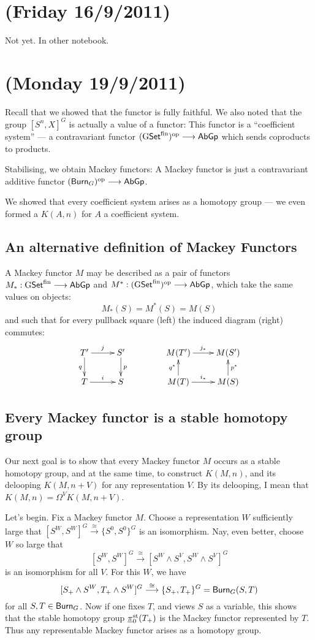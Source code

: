 \documentclass[11pt]{article}
\newcommand{\NewLecture}[3]{\section{#1 {\small(#2/#3/2011)}}}
\begin{document}
\NewLecture{}{Friday 16}{9} Not yet. In other notebook.
\NewLecture{}{Monday 19}{9} Recall that
we showed that the functor
is fully faithful. We also noted that the group $[S^n,X]^G$ is actually a value of a functor:
This functor is a ``coefficient system'' --- a contravariant functor $(\operatorname{{G\mathsf{Set}^\textup{fin}}})^{\textup{op}}\longrightarrow\operatorname{{\mathsf{AbGp}}}$ which sends coproducts to products.

Stabilising, we obtain Mackey functors:
A Mackey functor is just a contravariant additive functor $(\operatorname{{\mathsf{Burn}}}_G)^{\textup{op}}\longrightarrow\operatorname{{\mathsf{AbGp}}}$.

We showed that every coefficient system arises as a homotopy group --- we even formed a $K(A,n)$ for $A$ a coefficient system.
\subsection*{An alternative definition of Mackey Functors}
A Mackey functor $M$ may be described as a pair of functors $M_*:\operatorname{{G\mathsf{Set}^\textup{fin}}}\longrightarrow\operatorname{{\mathsf{AbGp}}}$ and $M^*:(\operatorname{{G\mathsf{Set}^\textup{fin}}})^{\textup{op}}\longrightarrow\operatorname{{\mathsf{AbGp}}}$, which take the same values on objects:
\[M_*(S)=M^*(S)=M(S)\]
and such that for every pullback square (left) the induced diagram (right) commutes:
\[\xymatrix@!0@R=12mm@C=1.5cm{
\ar[d]_qT'\ar[r]^j&S'\ar[d]^p\\
T\ar[r]^i&S
}\qquad\qquad\xymatrix@!0@R=12mm@C=2.05cm{
\ar[d];[]^{q^*}M(T')\ar[r]^{j_*}&M(S')\ar[d];[]_{p^*}\\
M(T)\ar[r]^{i_*}&M(S)
}\]
\subsection*{Every Mackey functor is a stable homotopy group}
Our next goal is to show that every Mackey functor $M$ occurs as a stable homotopy group, and at the same time, to construct $K(M,n)$, and its delooping $K(M,n+V)$ for any representation $V$. By its delooping, I mean that $K(M,n)=\Omega^VK(M,n+V)$.

Let's begin. Fix a Mackey functor $M$. Choose a representation $W$ sufficiently large that $[S^W,S^W]^G\overset{\cong}{\to}\{S^0,S^0\}^G$ is an isomorphism. Nay, even better, choose $W$ so large that
\[[S^W,S^W]^G\overset{\cong}{\to} [S^W\wedge S^V,S^W\wedge S^V]^G\]
is an isomorphism for all $V$. For this $W$, we have
\[[S_+\wedge S^W,T_+\wedge S^W]^G\overset{\cong}{\longrightarrow}\{S_+,T_+\}^G=\operatorname{{\mathsf{Burn}}}_G(S,T)\]
for all $S,T\in\operatorname{{\mathsf{Burn}}}_G$. 
Now if one fixes $T$, and views $S$ as a variable, this shows that the stable homotopy group $\underline\pi_0^{\textup{st}} (T_+)$ is the Mackey functor represented by $T$. Thus any representable Mackey functor arises as a homotopy group.
\end{document}
